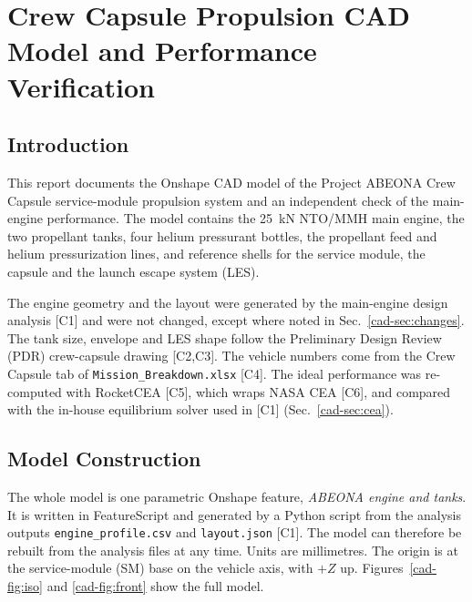 
\section{Crew Capsule Propulsion CAD Model and Performance Verification}\label{cad:top}

\subsection{Introduction}
This report documents the Onshape CAD model of the Project ABEONA Crew Capsule service-module propulsion system and an
independent check of the main-engine performance. The model contains the 25~kN NTO/MMH main engine, the two propellant
tanks, four helium pressurant bottles, the propellant feed and helium pressurization lines, and reference shells for the
service module, the capsule and the launch escape system (LES).

The engine geometry and the layout were generated by the main-engine design analysis [C1] and were not changed, except
where noted in Sec.~\ref{cad-sec:changes}. The tank size, envelope and LES shape follow the Preliminary Design Review (PDR)
crew-capsule drawing [C2,C3]. The vehicle numbers come from the Crew Capsule tab of \texttt{Mission\_Breakdown.xlsx} [C4].
The ideal performance was re-computed with RocketCEA [C5], which wraps NASA CEA [C6], and compared with the in-house
equilibrium solver used in [C1] (Sec.~\ref{cad-sec:cea}).

\subsection{Model Construction}
The whole model is one parametric Onshape feature, \emph{ABEONA engine and tanks}. It is written in FeatureScript and
generated by a Python script from the analysis outputs \texttt{engine\_profile.csv} and \texttt{layout.json} [C1]. The model
can therefore be rebuilt from the analysis files at any time. Units are millimetres. The origin is at the service-module
(SM) base on the vehicle axis, with $+Z$ up. Figures~\ref{cad-fig:iso} and \ref{cad-fig:front} show the full model.


